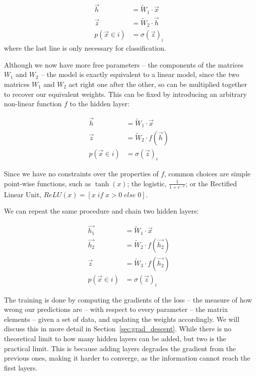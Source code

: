 \begin{align*}
\vec{h} &= \widetilde W_1 \cdot \vec{x} \\
\vec{z} &= \widetilde W_2 \cdot \vec{h} \\
p(\vec x \in i) &= \sigma(\vec z)_i
\end{align*}
where the last line is only necessary for classification.

Although we now have more free parameters -- the components of the matrices $W_1$ and $W_2$ -- the model is exactly equivalent to a linear model, since the two matrices $W_1$ and $W_2$ act right one after the other, so can be multiplied together to recover our equivalent weights.
This can be fixed by introducing an arbitrary non-linear function $f$ to the hidden layer:

\begin{align*}
\vec{h} &= \widetilde W_1 \cdot \vec{x} \\
\vec{z} &= \widetilde W_2 \cdot f(\vec{h}) \\
p(\vec x \in i) &= \sigma(\vec z)_i
\end{align*}

Since we have no constraints over the properties of $f$, common choices are simple point-wise functions, such as $\tanh(x)$; the logistic, $\frac{1}{1 + e^{-x}}$; or the Rectified Linear Unit, $ReLU(x)=[x \; if \; x > 0 \; else \; 0]$.

We can repeat the same procedure  and chain two hidden layers:

\begin{align*}
\vec{h_1} &= \widetilde W_1 \cdot \vec{x} \\
\vec{h_2} &= \widetilde W_2 \cdot f(\vec{h_2}) \\
\vec{z} &= \widetilde W_3 \cdot f(\vec{h_2}) \\
p(\vec x \in i) &= \sigma(\vec z)_i
\end{align*}

The training is done by computing the gradients of the loss -- the measure of how wrong our predictions are -- with respect to every parameter -- the matrix elements -- given a set of data, and updating the weights accordingly.
We will discuss this in more detail in Section~\ref{sec:grad_descent}.
While there is no theoretical limit to how many hidden layers can be added, but two is the practical limit.
This is because adding layers degrades the gradient from the previous ones, making it harder to converge, as the information cannot reach the first layers.


